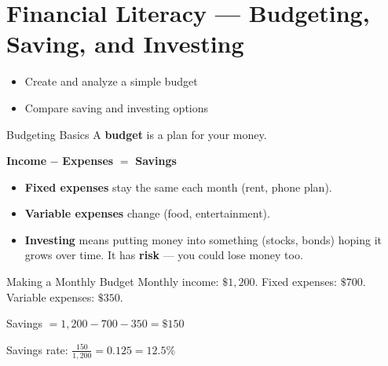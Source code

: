 \section{Financial Literacy --- Budgeting, Saving, and Investing}

\begin{learningGoals}
\begin{itemize}
    \item Create and analyze a simple budget
    \item Compare saving and investing options
\end{itemize}
\end{learningGoals}

\begin{conceptBox}{Budgeting Basics}
A \textbf{budget} is a plan for your money.

\textbf{Income} $-$ \textbf{Expenses} $=$ \textbf{Savings}

\begin{itemize}[leftmargin=*]
    \item \textbf{Fixed expenses} stay the same each month (rent, phone plan).
    \item \textbf{Variable expenses} change (food, entertainment).
    \item \textbf{Investing} means putting money into something (stocks, bonds) hoping it grows over time. It has \textbf{risk} --- you could lose money too.
\end{itemize}
\end{conceptBox}

\begin{workedExample}{Making a Monthly Budget}
Monthly income: $\$1{,}200$. Fixed expenses: $\$700$. Variable expenses: $\$350$.

Savings $= 1{,}200 - 700 - 350 = \$150$

Savings rate: $\frac{150}{1{,}200} = 0.125 = 12.5\%$
\end{workedExample}


